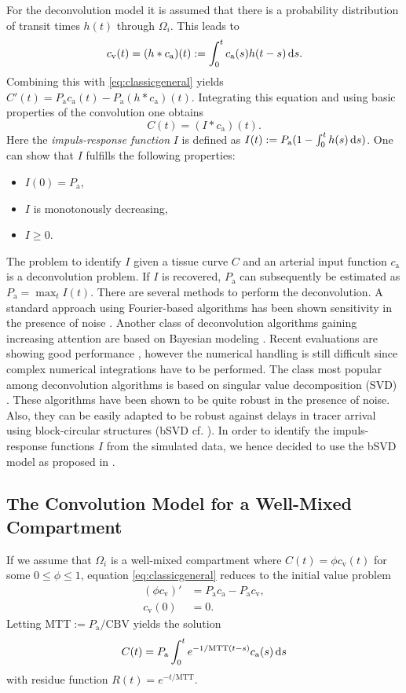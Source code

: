 \documentclass[paper=a4, fontsize=11pt,parskip=half,headings=small]{scrartcl}
\newcommand{\ca}{c_\mathrm{a}}
\newcommand{\CBV}{\mathrm{CBV}}
\newcommand{\MTT}{\mathrm{MTT}}
\newcommand{\cout}{c_{\mathrm{v}}}
\newcommand{\Pa}{P_{\mathrm{a}}}
\begin{document}
	For the deconvolution model it is assumed that there is a probability distribution of transit times $h(t)$ through $\Omega_i$. 
	This leads to
	\[
		\cout(t) = (h*\ca)(t) := \int_0^t \ca(s) h(t-s) \diffint s.
	\]
	Combining this with \eqref{eq:classicgeneral} yields $C'(t) = \Pa\ca(t)-\Pa (h*\ca)(t)$.
	Integrating this equation and using basic properties of the convolution one obtains
	\begin{equation}
		C(t) = (I*\ca)(t).
		\label{eq:conv}
	\end{equation}
	Here the \emph{impuls-response function} $I$ is defined as $I(t) := \Pa(1-\int_0^t h(s) \diffint s)$.
	One can show that $I$ fulfills the following properties:
	\begin{itemize}
		\item $I(0) = \Pa$,
		\item $I$ is monotonously decreasing,
		\item $I\ge 0$.		
	\end{itemize}
	The problem to identify $I$ given a tissue curve $C$ and an arterial input function $\ca$ is a deconvolution problem.
	If $I$ is recovered, $\Pa$ can subsequently be estimated as $\Pa = \max_{t} I(t)$.
	There are several methods to perform the deconvolution.
	A standard approach using Fourier-based algorithms has been shown sensitivity in the presence of noise \cite{wirestam00,ostergaard96}.
	Another class of deconvolution algorithms gaining increasing attention are based on Bayesian modeling \cite{boutelier12,mouridsen06}.
	Recent evaluations are showing good performance \cite{sasaki13}, however the numerical handling is still difficult since complex numerical integrations have to be performed.
	The class most popular among deconvolution algorithms is based on singular value decomposition (SVD) \cite{ostergaard96}.
	These algorithms have been shown to be quite robust in the presence of noise.
	Also, they can be easily adapted to be robust against delays in tracer arrival using block-circular structures (bSVD cf. \cite{wu03}).
	In order to identify the impuls-response functions $I$ from the simulated data, we hence decided to use the bSVD model as proposed in \cite{wu03}.

	\subsection{The Convolution Model for a Well-Mixed Compartment} \label{sec:comp}
	If we assume that $\Omega_i$ is a well-mixed compartment where $C(t) = \phi\cout(t)$ for some $0 \le \phi \le 1$, equation \eqref{eq:classicgeneral} reduces to the initial value problem
	\begin{align*}
		(\phi \cout)' &= \Pa \ca - \Pa \cout, \\
		\cout(0)&=0.
	\end{align*}
	Letting $\MTT:=\Pa/\CBV$ yields the solution
	\[
		C(t) = \Pa \int_0^t e^{-1/\MTT(t-s)}\ca(s)\diffint s
	\]
	with residue function $R(t)=e^{-t/\MTT}$. 
\end{document}
